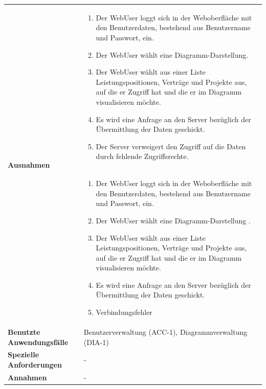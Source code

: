 \begin{longtable}[c]{|p{4cm}|p{10cm}|}
    \multirow{2}{*}{\textbf{Ausnahmen}} &
    \begin{enumerate} %
        \item Der WebUser loggt sich in der Weboberfläche mit den Benutzerdaten, bestehend aus Benutzername und Passwort, ein.
        \item Der WebUser wählt eine Diagramm-Darstellung.
        \item Der WebUser wählt aus einer Liste Leistungspositionen, Verträge und Projekte aus, auf die er Zugriff hat und die er im Diagramm visualisieren möchte.
        \item Es wird eine Anfrage an den Server bezüglich der Übermittlung der Daten geschickt.
        \item Der Server verweigert den Zugriff auf die Daten durch fehlende Zugriffsrechte.
    \end{enumerate}                                                                                                                                                                                                             \\\cline{2-2} &
    \begin{enumerate} %
        \item Der WebUser loggt sich in der Weboberfläche mit den Benutzerdaten, bestehend aus Benutzername und Passwort, ein.
        \item Der WebUser wählt eine Diagramm-Darstellung .
        \item Der WebUser wählt aus einer Liste Leistungspositionen, Verträge und Projekte aus, auf die er Zugriff hat und die er im Diagramm visualisieren möchte.
        \item Es wird eine Anfrage an den Server bezüglich der Übermittlung der Daten geschickt.
        \item Verbindungsfehler
    \end{enumerate}                                                                                                                                                                                                             \\ \hline
    \textbf{Benutzte Anwendungsfälle}   & Benutzerverwaltung (ACC-1), Diagrammverwaltung (DIA-1)                                                                                                                                           \\ \hline
    \textbf{Spezielle Anforderungen}    & -                                                                                                                                                                                                \\ \hline
    \textbf{Annahmen}                   & -                                                                                                                                                                                                \\ \hline
\end{longtable}
